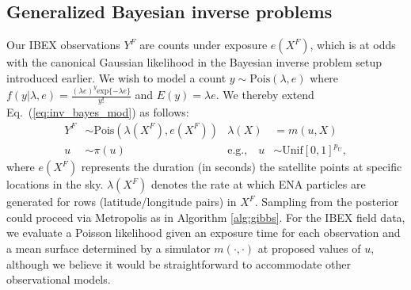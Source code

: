 \documentclass[11pt]{article}
\begin{document}
\subsection{Generalized Bayesian inverse problems}
\label{sec:gen_bayes_inv}

Our IBEX observations $Y^F$ are counts under exposure $e(X^F)$, which is at odds
with the canonical Gaussian likelihood in the Bayesian inverse problem setup
introduced earlier. We wish to model a count $y \sim \mathrm{Pois}(\lambda, e)$
where $f(y|\lambda, e) = \frac{(\lambda e)^y \mathrm{exp}\{-\lambda e\}}{y!}$
and $E(y) = \lambda e$. We thereby extend Eq.~(\ref{eq:inv_bayes_mod}) as
follows:
\begin{align}
Y^F &\sim \mathrm{Pois}(\lambda(X^F), e(X^F)) & \lambda(X) &= m(u, X) \nonumber
\label{eq:pois_inv_bayes_mod} \\ u &\sim \pi(u) & \mbox{e.g.,} \quad u &\sim \mathrm{Unif}[0,1]^{p_U},
\end{align}
where $e(X^F)$ represents the duration (in seconds) the satellite points at
specific locations in the sky. $\lambda(X^F)$ denotes the rate at which ENA
particles are generated for rows (latitude/longitude pairs) in $X^F$. Sampling
from the posterior could proceed via Metropolis as in Algorithm \ref{alg:gibbs}.
For the IBEX field data, we evaluate a Poisson likelihood given an exposure
time for each observation and a mean surface determined by a simulator
$m(\cdot,\cdot)$ at proposed values of $u$, although we believe it would be
straightforward to accommodate other observational models.
\end{document}

